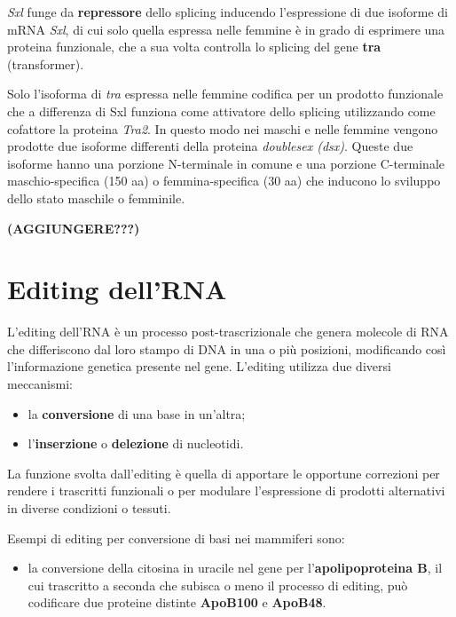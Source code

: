 \documentclass[11pt]{book}
\begin{document}
\emph{Sxl} funge da \textbf{repressore} dello splicing inducendo
l'espressione di due isoforme di mRNA \emph{Sxl}, di cui solo quella
espressa nelle femmine è in grado di esprimere una proteina funzionale,
che a sua volta controlla lo splicing del gene \textbf{tra}
(transformer).

Solo l'isoforma di \emph{tra} espressa nelle femmine codifica per un
prodotto funzionale che a differenza di Sxl funziona come attivatore
dello splicing utilizzando come cofattore la proteina \emph{Tra2}. In
questo modo nei maschi e nelle femmine vengono prodotte due isoforme
differenti della proteina \emph{doublesex (dsx)}. Queste due isoforme
hanno una porzione N-terminale in comune e una porzione C-terminale
maschio-specifica (150 aa) o femmina-specifica (30 aa) che inducono lo
sviluppo dello stato maschile o femminile.

\textbf{(AGGIUNGERE???)}

\section{Editing dell'RNA}\label{editing-dellrna}

L'editing dell'RNA è un processo post-trascrizionale che genera molecole
di RNA che differiscono dal loro stampo di DNA in una o più posizioni,
modificando così l'informazione genetica presente nel gene. L'editing
utilizza due diversi meccanismi:

\begin{itemize}
\itemsep1pt\parskip0pt
\item
  la \textbf{conversione} di una base in un'altra;
\item
  l'\textbf{inserzione} o \textbf{delezione} di nucleotidi.
\end{itemize}

La funzione svolta dall'editing è quella di apportare le opportune
correzioni per rendere i trascritti funzionali o per modulare
l'espressione di prodotti alternativi in diverse condizioni o tessuti.

Esempi di editing per conversione di basi nei mammiferi sono:

\begin{itemize}
\itemsep1pt\parskip0pt
\item
  la conversione della citosina in uracile nel gene per
  l'\textbf{apolipoproteina B}, il cui trascritto a seconda che subisca
  o meno il processo di editing, può codificare due proteine distinte
  \textbf{ApoB100} e \textbf{ApoB48}.
\end{itemize}
\end{document}
